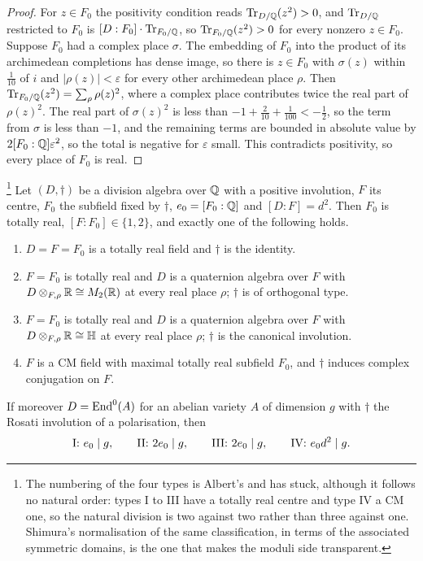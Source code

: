 \begin{proof}
For $z\in F_{0}$ the positivity condition reads
$\operatorname{Tr}_{D/\mathbb{Q}}(z^{2})>0$, and $\operatorname{Tr}_{D/\mathbb{Q}}$ restricted to $F_{0}$ is
$[D:F_{0}]\cdot\operatorname{Tr}_{F_{0}/\mathbb{Q}}$, so $\operatorname{Tr}_{F_{0}/\mathbb{Q}}(z^{2})>0$ for every
nonzero $z\in F_{0}$. Suppose $F_{0}$ had a complex place $\sigma$. The
embedding of $F_{0}$ into the product of its archimedean completions has dense
image, so there is $z\in F_{0}$ with $\sigma(z)$ within $\tfrac1{10}$ of $i$
and $|\rho(z)|<\varepsilon$ for every other archimedean place $\rho$. Then
$\operatorname{Tr}_{F_{0}/\mathbb{Q}}(z^{2})=\sum_{\rho}\rho(z)^{2}$, where a complex place
contributes twice the real part of $\rho(z)^{2}$. The real part of
$\sigma(z)^{2}$ is less than $-1+\tfrac{2}{10}+\tfrac{1}{100}<-\tfrac12$, so
the term from $\sigma$ is less than $-1$, and the remaining terms are
bounded in absolute value by $2[F_{0}:\mathbb{Q}]\varepsilon^{2}$, so the total is
negative for $\varepsilon$ small. This contradicts positivity, so every place
of $F_{0}$ is real.
\end{proof}

\begin{theorem}\label{thm:albert}%
\footnote{The numbering of the four types is Albert's and has stuck, although
it follows no natural order: types I to III have a totally real centre and
type IV a CM one, so the natural division is two against two rather than three
against one. Shimura's normalisation of the same classification, in terms of
the associated symmetric domains, is the one that makes the moduli side
transparent.}
Let $(D,\dagger)$ be a division algebra over $\mathbb{Q}$ with a positive involution,
$F$ its centre, $F_{0}$ the subfield fixed by $\dagger$, $e_{0}=[F_{0}:\mathbb{Q}]$
and $[D:F]=d^{2}$. Then $F_{0}$ is totally real, $[F:F_{0}]\in\{1,2\}$, and
exactly one of the following holds.
\begin{enumerate}[label=\textup{Type \Roman*.},leftmargin=4.2em,itemsep=2pt]
\item $D=F=F_{0}$ is a totally real field and $\dagger$ is the identity.
\item $F=F_{0}$ is totally real and $D$ is a quaternion algebra over $F$ with
  $D\otimes_{F,\rho}\mathbb{R}\cong M_{2}(\mathbb{R})$ at every real place $\rho$;
  $\dagger$ is of orthogonal type.
\item $F=F_{0}$ is totally real and $D$ is a quaternion algebra over $F$ with
  $D\otimes_{F,\rho}\mathbb{R}\cong\mathbb{H}$ at every real place $\rho$; $\dagger$
  is the canonical involution.
\item $F$ is a CM field with maximal totally real subfield $F_{0}$, and
  $\dagger$ induces complex conjugation on $F$.
\end{enumerate}
If moreover $D=\operatorname{End}^{0}(A)$ for an abelian variety $A$ of dimension $g$ with
$\dagger$ the Rosati involution of a polarisation, then
\[
  \text{\rm I: } e_{0}\mid g,
  \qquad
  \text{\rm II: } 2e_{0}\mid g,
  \qquad
  \text{\rm III: } 2e_{0}\mid g,
  \qquad
  \text{\rm IV: } e_{0}d^{2}\mid g .
\]
\end{theorem}

